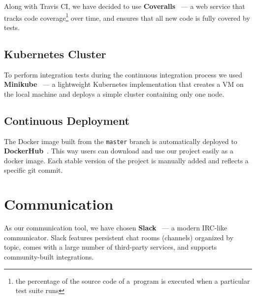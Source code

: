 Along with Travis CI, we have
decided to use \textbf{Coveralls}~\cite{coveralls} --- a web service that
tracks code coverage\footnote{the percentage of the source code of a~program
is executed when a particular test suite runs} over time, and ensures that
all new code is fully covered by tests.

\subsection{Kubernetes Cluster}
To perform integration tests during the continuous integration process we
used \textbf{Minikube}~\cite{minikube} --- a lightweight
Kubernetes implementation that creates a VM on the local machine and deploys
a simple cluster containing only one node.

\subsection{Continuous Deployment}
The Docker image built from the \texttt{master} branch is automatically
deployed to \textbf{DockerHub}~\cite{docker}. This way users can download
and use our project easily as a docker image. Each stable version of the
project is manually added and reflects a specific git commit.

\section{Communication}
As our communication tool, we have chosen \textbf{Slack}~\cite{slack} ---
a modern IRC-like communicator. Slack features persistent chat rooms
(channels) organized by topic, comes with a large number of third-party
services, and supports community-built integrations.
